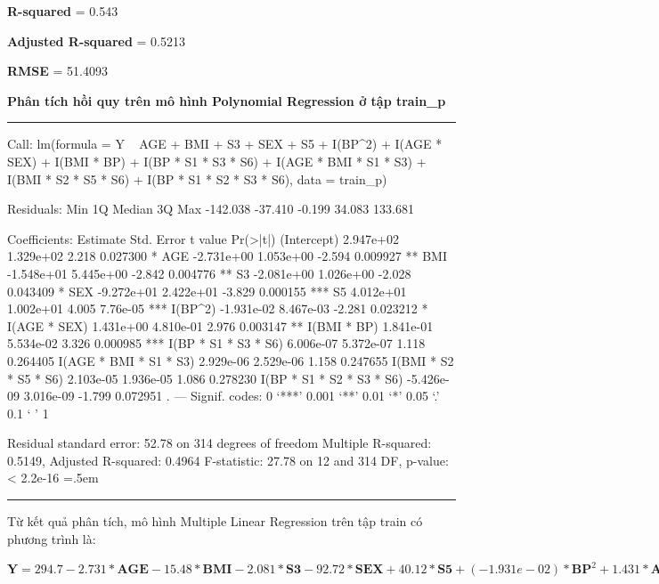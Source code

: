 \documentclass[runningheads]{llncs}
\newenvironment{lcverbatim}
 {\SaveVerbatim{cverb}}
 {\endSaveVerbatim
  \flushleft\fboxrule=0pt\fboxsep=.5em
  \colorbox{cverbbg}{%
    \makebox[\dimexpr\linewidth-2\fboxsep][l]{\BUseVerbatim{cverb}}%
  }
  \endflushleft
}
\begin{document}
\textbf{R-squared} = 0.543

\textbf{Adjusted R-squared} = 0.5213

\textbf{RMSE} = 51.4093

\vspace{0.5cm}
\textbf{Phân tích hồi quy trên mô hình Polynomial Regression ở tập train\_p}
\vspace{0.5cm}
\hrule
\begin{lcverbatim}
Call:
lm(formula = Y ~ AGE + BMI + S3 + SEX + S5 + I(BP^2) + I(AGE * 
    SEX) + I(BMI * BP) + I(BP * S1 * S3 * S6) + I(AGE * BMI * 
    S1 * S3) + I(BMI * S2 * S5 * S6) + I(BP * S1 * S2 * S3 * 
    S6), data = train_p)

Residuals:
     Min       1Q   Median       3Q      Max 
-142.038  -37.410   -0.199   34.083  133.681 

Coefficients:
                            Estimate Std. Error t value Pr(>|t|)    
(Intercept)                2.947e+02  1.329e+02   2.218 0.027300 *  
AGE                       -2.731e+00  1.053e+00  -2.594 0.009927 ** 
BMI                       -1.548e+01  5.445e+00  -2.842 0.004776 ** 
S3                        -2.081e+00  1.026e+00  -2.028 0.043409 *  
SEX                       -9.272e+01  2.422e+01  -3.829 0.000155 ***
S5                         4.012e+01  1.002e+01   4.005 7.76e-05 ***
I(BP^2)                   -1.931e-02  8.467e-03  -2.281 0.023212 *  
I(AGE * SEX)               1.431e+00  4.810e-01   2.976 0.003147 ** 
I(BMI * BP)                1.841e-01  5.534e-02   3.326 0.000985 ***
I(BP * S1 * S3 * S6)       6.006e-07  5.372e-07   1.118 0.264405    
I(AGE * BMI * S1 * S3)     2.929e-06  2.529e-06   1.158 0.247655    
I(BMI * S2 * S5 * S6)      2.103e-05  1.936e-05   1.086 0.278230    
I(BP * S1 * S2 * S3 * S6) -5.426e-09  3.016e-09  -1.799 0.072951 .  
---
Signif. codes:  0 ‘***’ 0.001 ‘**’ 0.01 ‘*’ 0.05 ‘.’ 0.1 ‘ ’ 1

Residual standard error: 52.78 on 314 degrees of freedom
Multiple R-squared:  0.5149,	Adjusted R-squared:  0.4964 
F-statistic: 27.78 on 12 and 314 DF,  p-value: < 2.2e-16
\end{lcverbatim}
\hrule
\vspace{0.5cm}

Từ kết quả phân tích, mô hình Multiple Linear Regression trên tập train có phương trình là:
\begin{center}
	$\textbf{Y}=  294.7-2.731* \textbf{AGE} -15.48*\textbf{BMI} -  2.081*\textbf{S3} -
	92.72*\textbf{SEX} +40.12*\textbf{S5} +(-1.931e-02)*\textbf{BP}^2+1.431*\textbf{AGE*SEX}+(1.841e-01)*\textbf{BM*BP}+(6.006e-07)*\textbf{BP*S1*S3*S6}+(2.929e-06)*\textbf{AGE*BMI*S1*S3}+(2.103e-05)*\textbf{BMI*S2*S5*S6}+(-5.426e-09)*\textbf{BP*S1*S2*S3*S6}$
\end{center}
\end{document}

